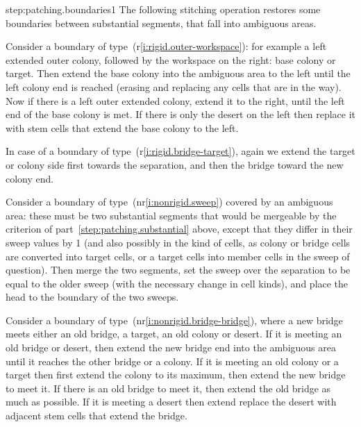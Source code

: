 \documentclass[12pt]{memoir}
\begin{document}
\begin{Proof}
\begin{step+}{step:patching.boundaries1}
The following stitching operation restores some boundaries between substantial segments,
that fall into ambiguous areas.
\end{step+}
\begin{prooofi}
Consider a boundary of type~(r\ref{i:rigid.outer-workspace}): for example
a left extended outer colony, followed by the workspace on the right: base colony or target.
Then extend the base colony into the ambiguous area
to the left until the left colony end is reached
(erasing and replacing any cells that are in the way).
Now if there is a left outer extended colony, extend it to the right, until
the left end of the base colony is met.
If there is only the desert on the left then replace it with stem cells that extend the base
colony to the left.

In case of a boundary of type~(r\ref{i:rigid.bridge-target}),
again we extend the target or colony side first towards the separation,
and then the bridge toward the new colony end.

Consider a boundary of type~(nr\ref{i:nonrigid.sweep}) covered by an ambiguous area:
these must be two substantial segments that would be mergeable by the criterion 
of part~\ref{step:patching.substantial} above, except that they
differ in their sweep values by 1 (and also possibly in the kind of cells,
as colony or bridge cells are converted into target cells, or a target cells into member cells
in the sweep of question).
Then merge the two segments, set the sweep over the separation to be equal
to the older sweep (with the necessary change in cell kinds), 
and place the head to the boundary of the two sweeps.

Consider a boundary of type~(nr\ref{i:nonrigid.bridge-bridge}), where a new bridge
meets either an old bridge, a target, an old colony or desert.
If it is meeting an old bridge or desert, then
extend the new bridge end into the ambiguous area until it reaches the
other bridge or a colony.
If it is meeting an old colony or a target then first extend the colony to its maximum,
then extend the new bridge to meet it.
If there is an old bridge to meet it, then extend the old bridge as much as possible.
If it is meeting a desert then extend replace the desert with adjacent 
stem cells that extend the bridge.
\end{prooofi} %


\end{Proof}
\end{document}
